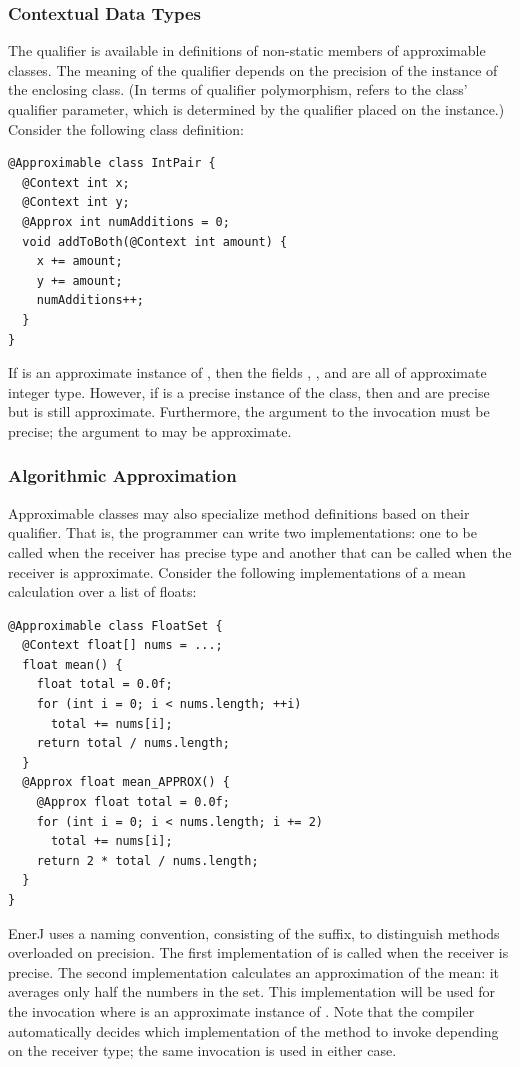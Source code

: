 \subsubsection{Contextual Data Types}
\label{context}
The  qualifier is available
in definitions of non-static members of approximable classes.
The meaning of
the qualifier depends on the precision of the instance of the
enclosing class. (In terms of qualifier polymorphism, 
refers to the class' qualifier parameter, which is determined by the
qualifier placed on the instance.)
Consider the following class definition:
\begin{lstlisting}
@Approximable class IntPair {
  @Context int x;
  @Context int y;
  @Approx int numAdditions = 0;
  void addToBoth(@Context int amount) {
    x += amount;
    y += amount;
    numAdditions++;
  }
}
\end{lstlisting}
If  is an approximate instance of , then the fields
, , and  are all of approximate
integer type. However, if  is a precise instance of the class, then
 and  are precise but  is still
approximate. Furthermore, the argument to the invocation 
must be precise; the argument to  may be
approximate.

\subsubsection{Algorithmic Approximation}
\label{overload}
Approximable classes may also specialize method definitions based on their
qualifier.
That is, the programmer can write two implementations:
one to be called when the receiver has
precise type and another that can be called when the receiver is approximate.
Consider the following implementations of a mean calculation over a list of
floats:
\begin{lstlisting}
@Approximable class FloatSet {
  @Context float[] nums = ...;
  float mean() {
    float total = 0.0f;
    for (int i = 0; i < nums.length; ++i)
      total += nums[i];
    return total / nums.length;
  }
  @Approx float mean_APPROX() {
    @Approx float total = 0.0f;
    for (int i = 0; i < nums.length; i += 2)
      total += nums[i];
    return 2 * total / nums.length;
  }
}
\end{lstlisting}
EnerJ uses a naming convention, consisting of the 
suffix, to distinguish methods overloaded on precision. The first
implementation of  is called when the receiver is
precise.
The second implementation calculates an approximation of the mean: it
averages only half the numbers in the set. This implementation will be
used for the invocation  where  is an
approximate instance of .
Note that the compiler automatically decides which implementation of the
method to invoke depending on the receiver type; the same invocation is used in
either case.


